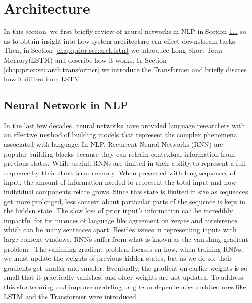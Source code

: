 \section{Architecture}
\label{chap:prior:sec:arch}
In this section, we first briefly review of neural networks in NLP in Section \ref{chap:prior:sec:arch:nn} so as to obtain insight into how system architecture can effect downstream tasks. Then, in Section \ref{chap:prior:sec:arch:lstm} we introduce Long Short Term Memory(LSTM) \cite{Hochreiter1997LongSM} and describe how it works. In Section \ref{chap:prior:sec:arch:transformer} we introduce the Transformer \cite{Vaswani2017AttentionIA} and briefly discuss how it differs from LSTM.
\subsection{Neural Network in NLP}
\label{chap:prior:sec:arch:nn}
In the last few decades, neural networks have provided language researchers with an effective method of building models that represent the complex phenomena associated with language. In NLP, Recurrent Neural Networks (RNN) are popular building blocks because they can retrain contextual information from previous states. While useful, RNNs are limited in their ability to represent a full sequence by their short-term memory. When presented with long sequences of input, the amount of information needed to represent the total input and how individual components relate grows. Since this state is limited in size as sequences get more prolonged, less context about particular parts of the sequence is kept in the hidden state. The slow loss of prior input's information can be incredibly impactful for for nuances of language like agreement on verges and coreference, which can be many sentences apart. Besides issues in representing inputs with large context windows, RNNs suffer from what is known as the vanishing gradient problem \cite{Hochreiter1998TheVG}. The vanishing gradient problem focuses on how, when training RNNs, we must update the weights of previous hidden states, but as we do so, their gradients get smaller and smaller. Eventually, the gradient on earlier weights is so small that it practically vanishes, and older weights are not updated. To address this shortcoming and improve modeling long term dependencies architectures like LSTM and the Transformer were introduced. 
